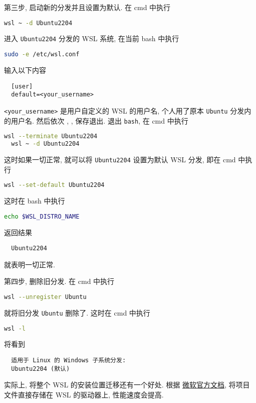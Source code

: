 第三步,
启动新的分发并且设置为默认.
在 \textsf{cmd} 中执行
\begin{lstlisting}[language=bash]
  wsl ~ -d Ubuntu2204
\end{lstlisting}
进入 \texttt{Ubuntu2204} 分发的 WSL 系统,
在当前 \textsf{bash} 中执行
\begin{lstlisting}[language=bash]
  sudo -e /etc/wsl.conf
\end{lstlisting}
输入以下内容
\begin{lstlisting}
  [user]
  default=<your_username>
\end{lstlisting}
\texttt{<your\_username>} 是用户自定义的 WSL 的用户名,
个人用了原本 \texttt{Ubuntu} 分发内的用户名.
然后依次 , , \keys{\enter} 保存退出.
退出 \texttt{bash},
在 \textsf{cmd} 中执行
\begin{lstlisting}[language=bash]
  wsl --terminate Ubuntu2204
  wsl ~ -d Ubuntu2204
\end{lstlisting}
这时如果一切正常,
就可以将 \texttt{Ubuntu2204} 设置为默认 WSL 分发,
即在 \textsf{cmd} 中执行
\begin{lstlisting}[language=bash]
  wsl --set-default Ubuntu2204
\end{lstlisting}
这时在 \textsf{bash} 中执行
\begin{lstlisting}[language=bash]
  echo $WSL_DISTRO_NAME
\end{lstlisting}
返回结果
\begin{lstlisting}
  Ubuntu2204
\end{lstlisting}
就表明一切正常.

第四步,
删除旧分发.
在 \textsf{cmd} 中执行
\begin{lstlisting}[language=bash]
  wsl --unregister Ubuntu
\end{lstlisting}
就将旧分发 \texttt{Ubuntu} 删除了.
这时在 \textsf{cmd} 中执行
\begin{lstlisting}[language=bash]
  wsl -l
\end{lstlisting}
将看到
\begin{lstlisting}
  适用于 Linux 的 Windows 子系统分发:
  Ubuntu2204 (默认)
\end{lstlisting}

实际上,
将整个 WSL 的安装位置迁移还有一个好处.
根据%
\href{https://learn.microsoft.com/zh-cn/windows/wsl/filesystems#file-storage-and-performance-across-file-systems}{微软官方文档},
将项目文件直接存储在 WSL 的驱动器上,
性能速度会提高.

